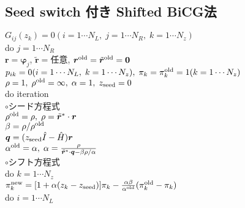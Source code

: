 \documentclass[12pt,titlepage]{jarticle}
\begin{document}
\subsection{Seed switch 付き Shifted BiCG法}

\noindent
$G_{i j}(z_k) = 0 (i=1 \cdots N_L,\; j = 1 \cdots N_R,\; k=1 \cdots N_z)$
\\
do $j = 1 \cdots N_R$
\\\hspace{0.5cm}
${\boldsymbol r} = {\boldsymbol \varphi_j}$, ${\tilde {\boldsymbol r}} = $任意,
${\boldsymbol r}^{\rm old} = {\tilde {\boldsymbol r}}^{\rm old} = {\bf 0}$
\\\hspace{0.5cm}
$p_{i k} = 0(i=1 \cdots N_L,\; k=1 \cdots N_z),\; \pi_k=\pi_k^{\rm old} = 1(k=1 \cdots N_z)$ 
\\\hspace{0.5cm}
$\rho = 1,\; \rho^{\rm old} = \infty,\; \alpha = 1,\; z_{\rm seed}=0$ 
\\\hspace{0.5cm}
do iteration
\\\hspace{1.0cm}
$\circ$シード方程式
\\\hspace{1.0cm}
$\rho^{\rm old} = \rho,\; \rho = {\tilde {\boldsymbol r}}^* \cdot {\boldsymbol r}$
\\\hspace{1.0cm}
$\beta = \rho / \rho^{\rm old}$
\\\hspace{1.0cm}
${\boldsymbol q} = (z_{\rm seed} {\hat I} - {\hat H}){\boldsymbol r}$
\\\hspace{1.0cm}
$\alpha^{\rm old} = \alpha,\; 
\alpha = \frac{\rho}{{\tilde {\boldsymbol r}}^*\cdot{\boldsymbol q} - \beta \rho / \alpha }$
\\\hspace{1.0cm}
$\circ$シフト方程式
\\\hspace{1.0cm}
do $k = 1 \cdots N_z$
\\\hspace{1.5cm}
$\pi_k^{\rm new} = [1+\alpha(z_k-z_{\rm seed})]\pi_k - \frac{\alpha \beta}{\alpha^{\rm old}}(\pi_k^{\rm old} - \pi_k)$
\\\hspace{1.5cm}
do $i = 1 \cdots N_L$
\\\hspace{2.0cm}
\end{document}
